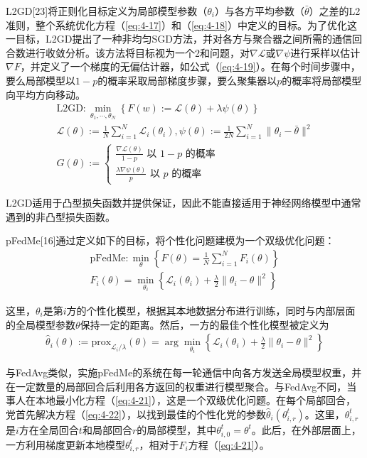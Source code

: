 L2GD[23]将正则化目标定义为局部模型参数（$\theta_{i}$）与各方平均参数（$\bar{\theta}$）之差的L2准则，整个系统优化方程（\ref{eq:4-17}）和（\ref{eq:4-18}）中定义的目标。为了优化这一目标，L2GD提出了一种非均匀SGD方法，并对各方与聚合器之间所需的通信回合数进行收敛分析。该方法将目标视为一个2和问题，对$\nabla \mathcal{L}$或$\nabla \psi$进行采样以估计$\nabla F$，并定义了一个梯度的无偏估计器，如公式（\ref{eq:4-19}）。在每个时间步骤中，要么局部模型以$1-p$的概率采取局部梯度步骤，要么聚集器以$p$的概率将局部模型向平均方向移动。
\begin{align}
	\text{L2GD}: \min_{\theta_{1}, \cdots, \theta_{N}} \left\{ F(w) := \mathcal{L}(\theta) + \lambda \psi(\theta) \right\} \label{eq:4-17} \\
	\mathcal{L}(\theta) := \frac{1}{N} \sum_{i=1}^{N} \mathcal{L}_{i}(\theta_{i}), \psi(\theta) := \frac{1}{2N} \sum_{i=1}^{N} \|\theta_{i} - \bar{\theta}\|^{2} \label{eq:4-18} \\
	G(\theta) := \left\{
		\begin{matrix}
			\frac{\nabla \mathcal{L}(\theta)}{1 - p} \text{ 以 } 1 - p \text{ 的概率} \\
			\frac{\lambda \nabla \psi(\theta)}{p} \text{ 以 } p \text{ 的概率}
		\end{matrix}
	\right. \label{eq:4-19}
\end{align}

L2GD适用于凸型损失函数并提供保证，因此不能直接适用于神经网络模型中通常遇到的非凸型损失函数。

pFedMe[16]通过定义如下的目标，将个性化问题建模为一个双级优化问题：
\begin{align}
	\text{pFedMe}: \min_{\theta} \left\{ F(\theta) = \frac{1}{N} \sum_{i=1}^{N}F_{i}(\theta) \right\} \label{eq:4-20} \\
	F_{i}(\theta) = \min_{\theta_{i}} \left\{ \mathcal{L}_{i}(\theta_{i}) + \frac{\lambda}{2}\|\theta_{i} - \theta\|^{2} \right\} \label{eq:4-21}
\end{align}

这里，$\theta_{i}$是第$i$方的个性化模型，根据其本地数据分布进行训练，同时与内部层面的全局模型参数$\theta$保持一定的距离。然后，一方的最佳个性化模型被定义为
\begin{align}\label{eq:4-22}
	\hat{\theta}_{i}(\theta) := \text{prox}_{\mathcal{L}_{i} / \lambda}(\theta) = \arg \min_{\theta_{i}} \left\{ \mathcal{L}_{i}(\theta_{i}) + \frac{\lambda}{2} \|\theta_{i} - \theta\|^{2} \right\}
\end{align}

与FedAvg类似，实施pFedMe的系统在每一轮通信中向各方发送全局模型权重，并在一定数量的局部回合后利用各方返回的权重进行模型聚合。与FedAvg不同，当事人在本地最小化方程（\ref{eq:4-21}），这是一个双级优化问题。在每个局部回合，党首先解决方程（\ref{eq:4-22}），以找到最佳的个性化党的参数$\hat{\theta}_{i}(\theta_{i, r}^{t})$。这里，$\theta_{i, r}^{t}$是$i$方在全局回合$t$和局部回合$r$的局部模型，其中$\theta_{i, 0}^{t} = \theta^{t}$。此后，在外部层面上，一方利用梯度更新本地模型$\theta_{i, r}^{t}$，相对于$F_{i}$方程（\ref{eq:4-21}）。

